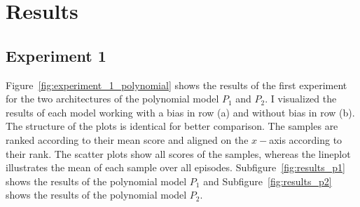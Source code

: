 \section{Results}
\subsection{Experiment 1}
Figure~\ref{fig:experiment_1_polynomial} shows the results of the first experiment for the two architectures of the polynomial model $P_1$ and $P_2$. I visualized the results of each model working with a bias in row (a) and without bias in row (b). The structure of the plots is identical for better comparison. The samples are ranked according to their mean score and aligned on the $x-$axis according to their rank. The scatter plots show all scores of the samples, whereas the lineplot illustrates the mean of each sample over all episodes.
Subfigure~\ref{fig:results_p1} shows the results of the polynomial model $P_1$ and Subfigure~\ref{fig:results_p2} shows the results of the polynomial model $P_2$.
